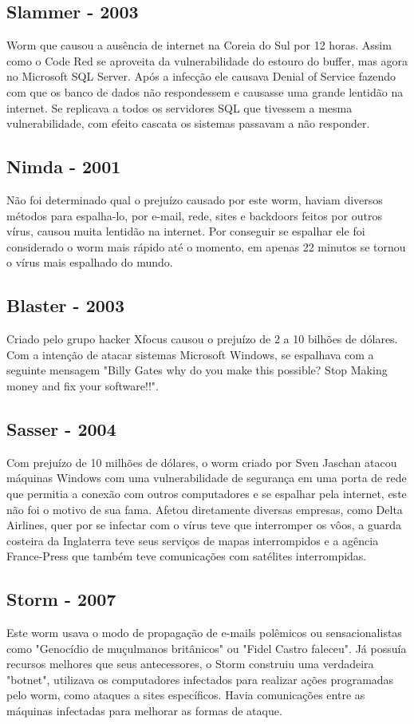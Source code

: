 \subsection{Slammer - 2003}

	Worm que causou a ausência de internet na Coreia do Sul por 12 horas. Assim como o Code Red se aproveita da vulnerabilidade do estouro do buffer, mas agora no Microsoft SQL Server. Após a infecção ele causava Denial of Service fazendo com que os banco de dados não respondessem e causasse uma grande lentidão na internet. Se replicava a todos os servidores SQL que tivessem a mesma vulnerabilidade, com efeito cascata os sistemas passavam a não responder.

\subsection{Nimda - 2001}
	Não foi determinado qual o prejuízo causado por este worm, haviam diversos métodos para espalha-lo, por e-mail, rede, sites e backdoors feitos por outros vírus, causou muita lentidão na internet. Por conseguir se espalhar ele  foi considerado o worm mais rápido até o momento, em apenas 22 minutos se tornou o vírus mais espalhado do mundo.

\subsection{Blaster - 2003}
	Criado pelo grupo hacker Xfocus causou o prejuízo de 2 a 10 bilhões de dólares. Com a intenção de atacar sistemas Microsoft Windows, se espalhava com a seguinte mensagem "Billy Gates why do you make this possible? Stop Making money and fix your software!!".
\subsection{Sasser - 2004}
	Com prejuízo de 10 milhões de dólares, o worm criado por Sven Jaschan atacou máquinas Windows com uma vulnerabilidade de segurança em uma porta de rede que permitia a conexão com outros computadores e se espalhar pela internet, este não foi o motivo de sua fama. Afetou diretamente diversas empresas, como Delta Airlines, quer por se infectar com o vírus teve que interromper os vôos, a guarda costeira da Inglaterra teve seus serviços de mapas interrompidos e a agência France-Press que também teve comunicações com satélites interrompidas.
\subsection{Storm - 2007}
	Este worm usava o modo de propagação de e-mails polêmicos ou sensacionalistas como "Genocídio de muçulmanos britânicos" ou "Fidel Castro faleceu". Já possuía recursos melhores que seus antecessores, o Storm construiu uma verdadeira "botnet", utilizava os computadores infectados para realizar ações programadas pelo worm, como ataques a sites específicos. Havia comunicações entre as máquinas infectadas para melhorar as formas de ataque.

